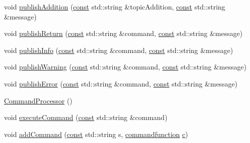 \begin{DoxyCompactItemize}
\item 
void \hyperlink{class_command_processor_a88ad204c02a79887698c6abc93729a2d}{publish\+Addition} (\hyperlink{functions__c_8js_afacfd9c985d225bb07483b887a801b6f}{const} std\+::string \&topic\+Addition, \hyperlink{functions__c_8js_afacfd9c985d225bb07483b887a801b6f}{const} std\+::string \&message)
\item 
void \hyperlink{class_command_processor_ae97c2e58deecce8bd6dac0d081d73f03}{publish\+Return} (\hyperlink{functions__c_8js_afacfd9c985d225bb07483b887a801b6f}{const} std\+::string \&command, \hyperlink{functions__c_8js_afacfd9c985d225bb07483b887a801b6f}{const} std\+::string \&message)
\item 
void \hyperlink{class_command_processor_a0f5c17ab23203abee8a48c82f3338a28}{publish\+Info} (\hyperlink{functions__c_8js_afacfd9c985d225bb07483b887a801b6f}{const} std\+::string \&command, \hyperlink{functions__c_8js_afacfd9c985d225bb07483b887a801b6f}{const} std\+::string \&message)
\item 
void \hyperlink{class_command_processor_a0691a985030ebb0cef833aa779bedeab}{publish\+Warning} (\hyperlink{functions__c_8js_afacfd9c985d225bb07483b887a801b6f}{const} std\+::string \&command, \hyperlink{functions__c_8js_afacfd9c985d225bb07483b887a801b6f}{const} std\+::string \&message)
\item 
void \hyperlink{class_command_processor_a81e3fda8d03c8f5aea99a442ebdb0050}{publish\+Error} (\hyperlink{functions__c_8js_afacfd9c985d225bb07483b887a801b6f}{const} std\+::string \&command, \hyperlink{functions__c_8js_afacfd9c985d225bb07483b887a801b6f}{const} std\+::string \&message)
\item 
\hyperlink{class_command_processor_a5643028cf10be143aab4e42939b22880}{Command\+Processor} ()
\item 
void \hyperlink{class_command_processor_a3a830f1939e458f31f0cd2d42855609f}{execute\+Command} (\hyperlink{functions__c_8js_afacfd9c985d225bb07483b887a801b6f}{const} std\+::string \&command)
\item 
void \hyperlink{class_command_processor_a67598e9086a7c3a7228c078acb7f4eab}{add\+Command} (\hyperlink{functions__c_8js_afacfd9c985d225bb07483b887a801b6f}{const} std\+::string s, \hyperlink{_command_processor_8h_a28db7178a71eff1027c055c9b19f6215}{commandfunction} \hyperlink{functions__f_8js_aadfd49790b56c82605242ff3896447ed}{c})
\end{DoxyCompactItemize}
